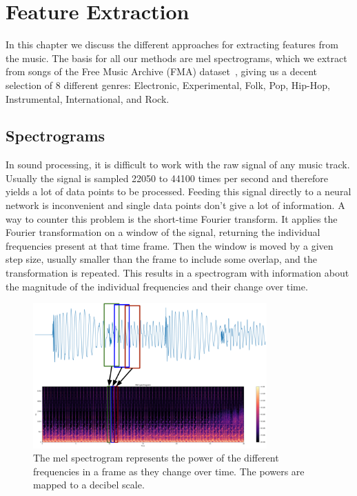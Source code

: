 \chapter{Feature Extraction}\label{ch:extraction}
    In this chapter we discuss the different approaches for extracting features from the music. 
    The basis for all our methods are mel spectrograms, which we extract from songs of the Free Music Archive (FMA) dataset~\cite{FMA}, giving us a decent selection of 8 different genres: Electronic, Experimental, Folk, Pop, Hip-Hop, Instrumental, International, and Rock.

\section{Spectrograms}
    In sound processing, it is difficult to work with the raw signal of any music track.
    Usually the signal is sampled 22050 to 44100 times per second and therefore yields a lot of data points to be processed. 
    Feeding this signal directly to a neural network is inconvenient and single data points don't give a lot of information.
    A way to counter this problem is the short-time Fourier transform. 
    It applies the Fourier transformation on a window of the signal, returning the individual frequencies present at that time frame. 
    Then the window is moved by a given step size, usually smaller than the frame to include some overlap, and the transformation is repeated.
    This results in a spectrogram with information about the magnitude of the individual frequencies and their change over time.\\
    \begin{figure}[!b]
        \centering
        \includegraphics[width=0.8\textwidth]{images/sigToMels.png}
        \caption{The mel spectrogram represents the power of the different frequencies in a frame as they change over time. The powers are mapped to a decibel scale.}
        \label{mel}
    \end{figure}
